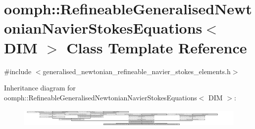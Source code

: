 \hypertarget{classoomph_1_1RefineableGeneralisedNewtonianNavierStokesEquations}{}\section{oomph\+:\+:Refineable\+Generalised\+Newtonian\+Navier\+Stokes\+Equations$<$ D\+IM $>$ Class Template Reference}
\label{classoomph_1_1RefineableGeneralisedNewtonianNavierStokesEquations}


{\ttfamily \#include $<$generalised\+\_\+newtonian\+\_\+refineable\+\_\+navier\+\_\+stokes\+\_\+elements.\+h$>$}

Inheritance diagram for oomph\+:\+:Refineable\+Generalised\+Newtonian\+Navier\+Stokes\+Equations$<$ D\+IM $>$\+:\begin{figure}[H]
\begin{center}
\leavevmode
\includegraphics[height=0.935412cm]{classoomph_1_1RefineableGeneralisedNewtonianNavierStokesEquations}
\end{center}
\end{figure}
